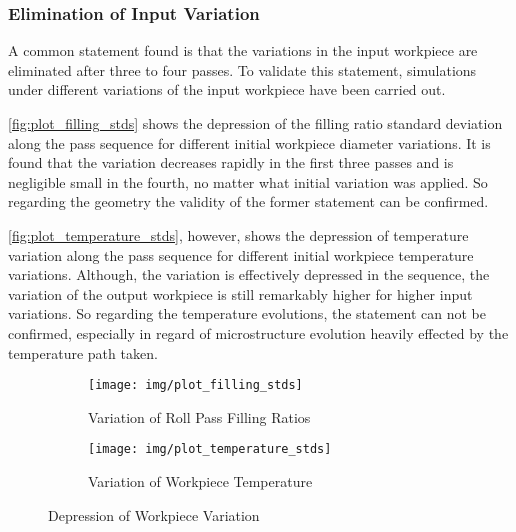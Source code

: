 \subsubsection{Elimination of Input Variation}\label{subsubsec:elimination-of-input-variation}

A common statement found is that the variations in the input workpiece are eliminated after three to four passes.
To validate this statement, simulations under different variations of the input workpiece have been carried out.

\autoref{fig:plot_filling_stds} shows the depression of the filling ratio standard deviation along the pass sequence for different initial workpiece diameter variations.
It is found that the variation decreases rapidly in the first three passes and is negligible small in the fourth, no matter what initial variation was applied.
So regarding the geometry the validity of the former statement can be confirmed.

\autoref{fig:plot_temperature_stds}, however, shows the depression of temperature variation along the pass sequence for different initial workpiece temperature variations.
Although, the variation is effectively depressed in the sequence, the variation of the output workpiece is still remarkably higher for higher input variations.
So regarding the temperature evolutions, the statement can not be confirmed, especially in regard of microstructure evolution heavily effected by the temperature path taken.

\begin{figure}
    \begin{subfigure}{\linewidth}
        \centering
        \texttt{[image: img/plot\_filling\_stds]}
        \caption{Variation of Roll Pass Filling Ratios}
        \label{fig:plot_filling_stds}
    \end{subfigure}
    \begin{subfigure}{\linewidth}
        \centering
        \texttt{[image: img/plot\_temperature\_stds]}
        \caption{Variation of Workpiece Temperature}
        \label{fig:plot_temperature_stds}
    \end{subfigure}
    \caption{Depression of Workpiece Variation}
\end{figure}